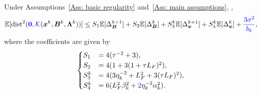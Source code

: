 \begin{lemma}
    \label{Lemma: Stationarity error bound in SGDM} Under Assumptions~\ref{Ass: basic regularity} and~\ref{Ass: main assumptions},
    ,
    \begin{align}\label{Eq: the stationarity error bound in SGDM Lemma}
        \EE [\mathrm{dist}^{2}(\blue{\bm{0}, \mathcal K}(\bx^{k}, \bB^{k}, \bm{\Lambda}^{k}))] \leq S_{1}\EE[ \Delta_{\bB}^{k+1}] + S_{2}\EE[ \Delta_{\bB}^{k}] + S_{3}^{k}\EE[ \Delta_{\bm{x}}^{k+1}] + S_{4}^{k}\EE [\Delta_{\bm{x}}^{k}] + \blue{\frac{3\sigma^{2}}{b_{k}}},
    \end{align}
    where the coefficients are given by
    \begin{align}
        \label{Eq: the coefficients of stationarity error bound in SGDM}\begin{cases}S_{1}&= 4(\tau^{-2}+ 3),\\ S_{2}&= 4(1 + 3 (1 + \tau L_{F})^{2}),\\ S_{3}^{k}&= 4(3\eta_{k}^{-2}+ L_{F}^{2}+ 3 (\tau L_{F})^{2}),\\ S_{4}^{k}&= 6 ( L^2_{F}\beta_{k}^{2}+ \blue{2} \eta_{k}^{-2}\alpha_{k}^{2}).\end{cases}
    \end{align}
\end{lemma}
